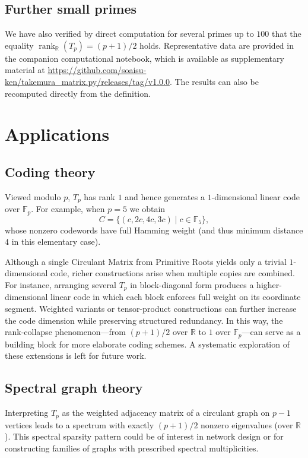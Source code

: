 \documentclass[11pt,a4paper]{article}
\theoremstyle{plain}
\theoremstyle{definition}
\begin{document}
\subsection*{Further small primes}
We have also verified by direct computation for several primes up to $100$ that the equality $\operatorname{rank}_{\mathbb{R}}(T_p) = (p+1)/2$ holds. Representative data are provided in the companion computational notebook, which is available as supplementary material at \url{https://github.com/soaisu-ken/takemura_matrix.py/releases/tag/v1.0.0}. The results can also be recomputed directly from the definition.

\section{Applications}

\subsection{Coding theory}
Viewed modulo $p$, $T_p$ has rank $1$ and hence generates a $1$-dimensional
linear code over $\mathbb{F}_p$. For example, when $p=5$ we obtain
\[
C = \{(c, 2c, 4c, 3c) \mid c \in \mathbb{F}_5\},
\]
whose nonzero codewords have full Hamming weight (and thus minimum
distance $4$ in this elementary case). 

Although a single Circulant Matrix from Primitive Roots yields only a trivial $1$-dimensional
code, richer constructions arise when multiple copies are combined.
For instance, arranging several $T_p$ in block-diagonal form produces a
higher-dimensional linear code in which each block enforces full weight
on its coordinate segment. Weighted variants or tensor-product
constructions can further increase the code dimension while preserving
structured redundancy. In this way, the rank-collapse phenomenon---from
$(p+1)/2$ over $\mathbb{R}$ to $1$ over $\mathbb{F}_p$---can serve as a
building block for more elaborate coding schemes. A systematic exploration
of these extensions is left for future work.

\subsection{Spectral graph theory}
Interpreting $T_p$ as the weighted adjacency matrix of a circulant graph on
$p-1$ vertices leads to a spectrum with exactly $(p+1)/2$ nonzero eigenvalues
(over $\mathbb{R}$). This spectral sparsity pattern could be of interest in
network design or for constructing families of graphs with prescribed spectral
multiplicities. 
\end{document}
